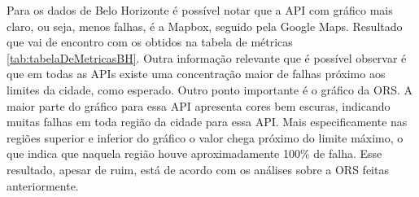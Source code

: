Para os dados de Belo Horizonte é possível notar que a API com gráfico mais claro, ou seja, menos falhas, é a Mapbox, seguido pela Google Maps. Resultado que vai de encontro com os obtidos na tabela de métricas \ref{tab:tabelaDeMetricasBH}. Outra informação relevante que é possível observar é que em todas as APIs existe uma concentração maior de falhas próximo aos limites da cidade, como esperado. Outro ponto importante é o gráfico da ORS. A maior parte do gráfico para essa API apresenta cores bem escuras, indicando muitas falhas em toda região da cidade para essa API. Mais especificamente nas regiões superior e inferior do gráfico o valor chega próximo do limite máximo, o que indica que naquela região houve aproximadamente 100\% de falha. Esse resultado, apesar de ruim, está de acordo com os análises sobre a ORS feitas anteriormente. 


